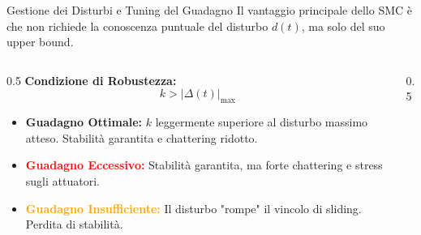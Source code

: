 \documentclass[aspectratio=169]{beamer} %
\begin{document}
\begin{frame}{Gestione dei Disturbi e Tuning del Guadagno}
    Il vantaggio principale dello SMC è che non richiede la conoscenza puntuale del disturbo $d(t)$, ma solo del suo upper bound.
    \begin{columns}[c]
        \begin{column}{0.5\textwidth}
            \textbf{Condizione di Robustezza:}
            $$ k > |\Delta(t)|_{\max} $$
            \small
            \begin{itemize}
                \item \textcolor{green!60!black}{\textbf{Guadagno Ottimale:}} $k$ leggermente superiore al disturbo massimo atteso. Stabilità garantita e chattering ridotto.
                \item \textcolor{red}{\textbf{Guadagno Eccessivo:}} Stabilità garantita, ma forte chattering e stress sugli attuatori.
                \item \textcolor{orange}{\textbf{Guadagno Insufficiente:}} Il disturbo "rompe" il vincolo di sliding. Perdita di stabilità.
            \end{itemize}
        \end{column}
        \begin{column}{0.5\textwidth}
            \centering
        \end{column}
    \end{columns}
\end{frame}
\end{document}

